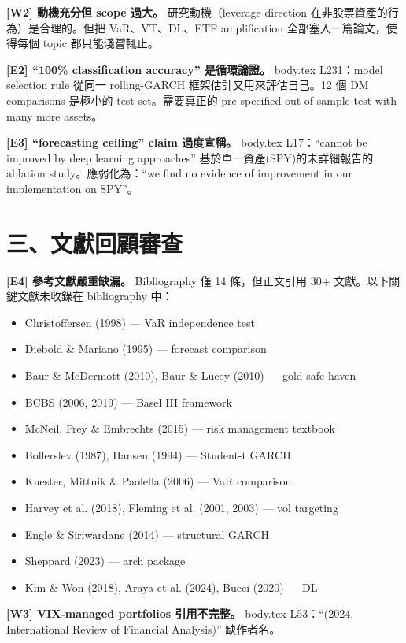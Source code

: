 \documentclass[12pt,a4paper]{article}
\begin{document}
\textcolor{warncolor}{\textbf{[W2] 動機充分但 scope 過大。}} 研究動機（leverage direction 在非股票資產的行為）是合理的。但把 VaR、VT、DL、ETF amplification 全部塞入一篇論文，使得每個 topic 都只能淺嘗輒止。

\textcolor{errorred}{\textbf{[E2] ``100\% classification accuracy'' 是循環論證。}} body.tex L231：model selection rule 從同一 rolling-GARCH 框架估計又用來評估自己。12 個 DM comparisons 是極小的 test set。需要真正的 pre-specified out-of-sample test with many more assets。

\textcolor{errorred}{\textbf{[E3] ``forecasting ceiling'' claim 過度宣稱。}} body.tex L17：``cannot be improved by deep learning approaches'' 基於單一資產(SPY)的未詳細報告的 ablation study。應弱化為：``we find no evidence of improvement in our implementation on SPY''。

\section*{三、文獻回顧審查}

\textcolor{errorred}{\textbf{[E4] 參考文獻嚴重缺漏。}} Bibliography 僅 14 條，但正文引用 30+ 文獻。以下關鍵文獻未收錄在 bibliography 中：

\begin{itemize}[nosep]
\item Christoffersen (1998) — VaR independence test
\item Diebold \& Mariano (1995) — forecast comparison
\item Baur \& McDermott (2010), Baur \& Lucey (2010) — gold safe-haven
\item BCBS (2006, 2019) — Basel III framework
\item McNeil, Frey \& Embrechts (2015) — risk management textbook
\item Bollerslev (1987), Hansen (1994) — Student-t GARCH
\item Kuester, Mittnik \& Paolella (2006) — VaR comparison
\item Harvey et al. (2018), Fleming et al. (2001, 2003) — vol targeting
\item Engle \& Siriwardane (2014) — structural GARCH
\item Sheppard (2023) — arch package
\item Kim \& Won (2018), Araya et al. (2024), Bucci (2020) — DL
\end{itemize}

\textcolor{warncolor}{\textbf{[W3] VIX-managed portfolios 引用不完整。}} body.tex L53：``(2024, International Review of Financial Analysis)'' 缺作者名。
\end{document}
